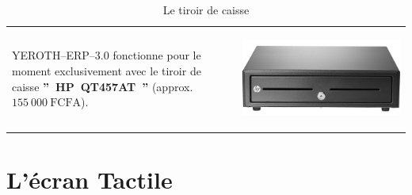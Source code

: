 \documentclass[12pt, a4paper]{article}
\newcommand{\yerotherp}{\textcolor{yerenColorBlue}{\sc YEROTH--ERP--$3.0$}\xspace}
\newcommand{\money}[1]{$#1\ \text{FCFA}$}
\begin{document}
\begin{table}[!htbp]
\begin{tabular}{lr}
\parbox{25em}{
\yerotherp fonctionne pour le moment
exclusivement avec le tiroir de caisse
\textbf{''~HP~QT457AT~''} (approx.~\money{155~000}).
\vspace{-3em}
}

&

\parbox{17em}{
\begin{center}
\includegraphics[scale=0.07]{images/hp-cash-drawer.png}
\caption*{Le tiroir de caisse}
\end{center}
}
\end{tabular}
\end{table}

\vspace{-1.5em}
\section{L'\'ecran Tactile}
\vspace{-2.5em}
\end{document}
